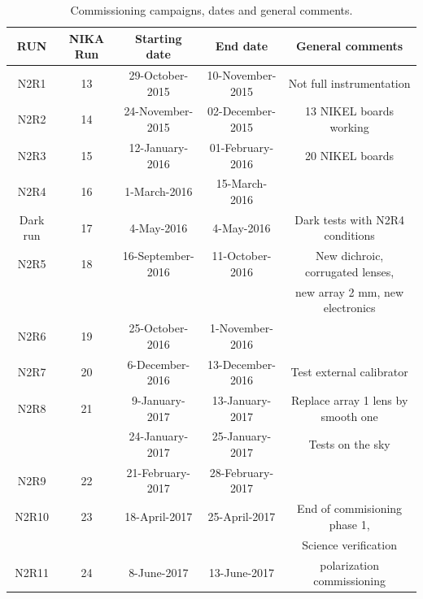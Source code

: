 \documentclass[a4paper, 11pt]{article} %
\begin{document}
\begin{table}[h]
\small
\caption{Commissioning campaigns, dates and general comments.
\label{nika2runs}}
\begin{tabular}{|c|c|c|c|c|}
\hline 
RUN  & NIKA Run & Starting date    & End date         &  General comments \\
\hline
N2R1     & 13       & 29-October-2015   & 10-November-2015 & Not full instrumentation        \\
N2R2     & 14       & 24-November-2015  & 02-December-2015 & 13 NIKEL boards working         \\
N2R3     & 15       & 12-January-2016   & 01-February-2016 & 20 NIKEL boards                 \\
N2R4     & 16       & 1-March-2016      & 15-March-2016    & 	                               \\
Dark run & 17       & 4-May-2016        & 4-May-2016       & Dark tests with N2R4 conditions  \\
\hline
N2R5     & 18       & 16-September-2016 & 11-October-2016  & New dichroic, corrugated lenses, \\
         &          &                   &                  &  new array 2 mm, new electronics \\
N2R6     & 19       & 25-October-2016   & 1-November-2016  &                                  \\
N2R7     & 20       & 6-December-2016   & 13-December-2016 & Test external calibrator         \\
N2R8     & 21       & 9-January-2017    & 13-January-2017  & Replace array 1 lens by smooth one \\
         &          & 24-January-2017   & 25-January-2017  & Tests on the sky   \\
N2R9     & 22       & 21-February-2017  & 28-February-2017 &                                   \\
N2R10    & 23       & 18-April-2017     & 25-April-2017    & End of commisioning phase 1,     \\
         &          &                   &                  & Science verification  \\  
N2R11  & 24       &  8-June-2017   & 13-June-2017  &  polarization commissioning  \\
\hline
\end{tabular} 
\end{table} 


\end{document}
